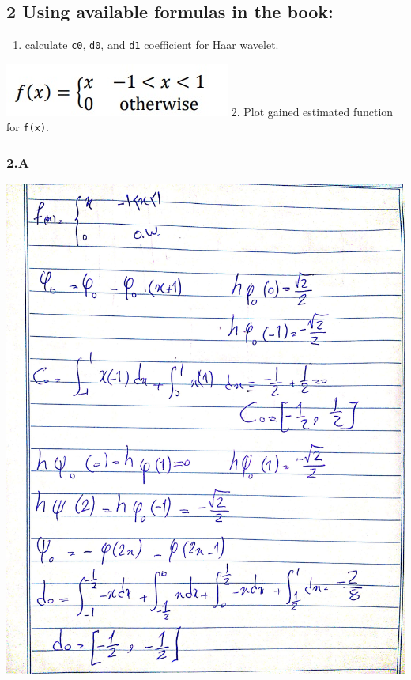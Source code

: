 \documentclass[11pt]{article}
\makeatletter
\def\maxwidth{\ifdim\Gin@nat@width>\linewidth\linewidth
    \else\Gin@nat@width\fi}
\let\Oldincludegraphics\includegraphics
\renewcommand{\includegraphics}[1]{\Oldincludegraphics[width=.8\maxwidth]{#1}}
\providecommand{\tightlist}{%
      \setlength{\itemsep}{0pt}\setlength{\parskip}{0pt}}
\makeatother
\begin{document}
    \hypertarget{using-available-formulas-in-the-book}{%
\subsection{2 Using available formulas in the
book:}\label{using-available-formulas-in-the-book}}

\begin{enumerate}
\def\labelenumi{\arabic{enumi}.}
\tightlist
\item
  calculate \texttt{c0}, \texttt{d0}, and \texttt{d1} coefficient for
  Haar wavelet.
\end{enumerate}

\includegraphics{wiki/q2.jpg} 2. Plot gained estimated function for
\texttt{f(x)}.

    \hypertarget{a}{%
\subsubsection{2.A}\label{a}}

\includegraphics{wiki/eqq2.jpg}
\end{document}
